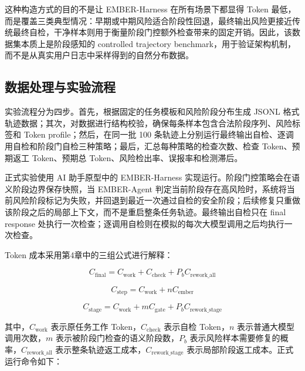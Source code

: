 

这种构造方式的目的不是让 EMBER-Harness 在所有场景下都显得 Token 最低，而是覆盖三类典型情况：早期或中期风险适合阶段性回退，最终输出风险更接近传统最终自检，干净样本则用于衡量阶段门控额外检查带来的固定开销。因此，该数据集本质上是阶段感知的 controlled trajectory benchmark，用于验证架构机制，而不是从真实用户日志中采样得到的自然分布数据。

\subsection{数据处理与实验流程}

实验流程分为四步。首先，根据固定的任务模板和风险阶段分布生成 JSONL 格式轨迹数据；其次，对数据进行结构校验，确保每条样本包含合法阶段序列、风险标签和 Token profile；然后，在同一批 100 条轨迹上分别运行最终输出自检、逐调用自检和阶段门自检三种策略；最后，汇总每种策略的检查次数、检查 Token、预期返工 Token、预期总 Token、风险检出率、误报率和检测滞后。

正式实验使用 AI 助手原型中的 EMBER-Harness 实现运行。阶段门控策略会在语义阶段边界保存快照，当 EMBER-Agent 判定当前阶段存在高风险时，系统将当前风险阶段标记为失败，并回退到最近一次通过自检的安全阶段；后续修复只重做该阶段之后的局部上下文，而不是重启整条任务轨迹。最终输出自检只在 final response 处执行一次检查；逐调用自检则在模拟的每次大模型调用之后均执行一次检查。

Token 成本采用第4章中的三组公式进行解释：

\begin{equation}
C_{\mathrm{final}} = C_{\mathrm{work}} + C_{\mathrm{check}} + P_b C_{\mathrm{rework\_all}}
\end{equation}

\begin{equation}
C_{\mathrm{step}} = C_{\mathrm{work}} + n C_{\mathrm{ember}}
\end{equation}

\begin{equation}
C_{\mathrm{stage}} = C_{\mathrm{work}} + m C_{\mathrm{gate}} + P_b C_{\mathrm{rework\_stage}}
\end{equation}

其中，$C_{\mathrm{work}}$ 表示原任务工作 Token，$C_{\mathrm{check}}$ 表示自检 Token，$n$ 表示普通大模型调用次数，$m$ 表示被阶段门检查的语义阶段数，$P_b$ 表示风险样本需要修复的概率，$C_{\mathrm{rework\_all}}$ 表示整条轨迹返工成本，$C_{\mathrm{rework\_stage}}$ 表示局部阶段返工成本。正式运行命令如下：


